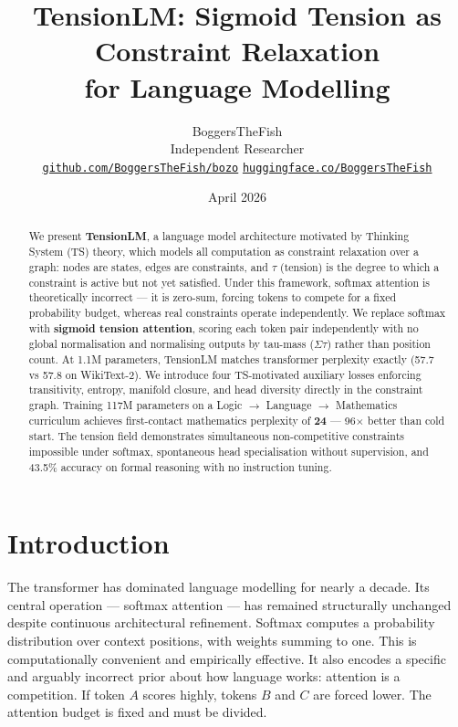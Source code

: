 \documentclass[10pt,a4paper]{article}
\title{\textbf{TensionLM: Sigmoid Tension as Constraint Relaxation\\for Language Modelling}}
\author{
    BoggersTheFish\\
    Independent Researcher\\
    \texttt{\href{https://github.com/BoggersTheFish/bozo}{github.com/BoggersTheFish/bozo}}
    \quad
    \texttt{\href{https://huggingface.co/BoggersTheFish/TensionLM-117M-Curriculum}{huggingface.co/BoggersTheFish}}
}
\date{April 2026}
\begin{document}
\maketitle

\begin{abstract}
We present \textbf{TensionLM}, a language model architecture motivated by Thinking System (TS) theory, which models all computation as constraint relaxation over a graph: nodes are states, edges are constraints, and $\tau$ (tension) is the degree to which a constraint is active but not yet satisfied. Under this framework, softmax attention is theoretically incorrect --- it is zero-sum, forcing tokens to compete for a fixed probability budget, whereas real constraints operate independently. We replace softmax with \textbf{sigmoid tension attention}, scoring each token pair independently with no global normalisation and normalising outputs by tau-mass ($\Sigma\tau$) rather than position count. At 1.1M parameters, TensionLM matches transformer perplexity exactly (57.7 vs 57.8 on WikiText-2). We introduce four TS-motivated auxiliary losses enforcing transitivity, entropy, manifold closure, and head diversity directly in the constraint graph. Training 117M parameters on a Logic $\rightarrow$ Language $\rightarrow$ Mathematics curriculum achieves first-contact mathematics perplexity of \textbf{24} --- 96$\times$ better than cold start. The tension field demonstrates simultaneous non-competitive constraints impossible under softmax, spontaneous head specialisation without supervision, and 43.5\% accuracy on formal reasoning with no instruction tuning.
\end{abstract}

\section{Introduction}

The transformer \cite{vaswani2017attention} has dominated language modelling for nearly a decade. Its central operation --- softmax attention --- has remained structurally unchanged despite continuous architectural refinement. Softmax computes a probability distribution over context positions, with weights summing to one. This is computationally convenient and empirically effective. It also encodes a specific and arguably incorrect prior about how language works: attention is a competition. If token $A$ scores highly, tokens $B$ and $C$ are forced lower. The attention budget is fixed and must be divided.
\end{document}
